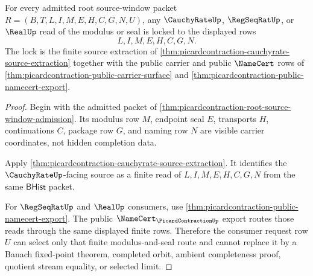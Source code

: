 \begin{theorem}
\label{thm:picardcontraction-root-modulus-consumer-lock}
For every admitted root source-window packet
$R=(B,T,L,I,M,E,H,C,G,N,U)$, any $\CauchyRateUp$, $\RegSeqRatUp$, or
$\RealUp$ read of the modulus or seal is locked to the displayed rows
$$
L,I,M,E,H,C,G,N.
$$
The lock is the finite source extraction of
\autoref{thm:picardcontraction-cauchyrate-source-extraction} together with the
public carrier and public $\NameCert$ rows of
\autoref{thm:picardcontraction-public-carrier-surface} and
\autoref{thm:picardcontraction-public-namecert-export}.
\end{theorem}
\begin{proof}
Begin with the admitted packet of
\autoref{thm:picardcontraction-root-source-window-admission}. Its modulus row
$M$, endpoint seal $E$, transports $H$, continuations $C$, package row $G$,
and naming row $N$ are visible carrier coordinates, not hidden completion
data.

Apply \autoref{thm:picardcontraction-cauchyrate-source-extraction}. It
identifies the $\CauchyRateUp$-facing source as a finite read of
$L,I,M,E,H,C,G,N$ from the same $\mathsf{BHist}$ packet.

For $\RegSeqRatUp$ and $\RealUp$ consumers, use
\autoref{thm:picardcontraction-public-namecert-export}. The public
$\NameCert_{\PicardContractionUp}$ export routes those reads through the same
displayed finite rows. Therefore the consumer request row $U$ can select only
that finite modulus-and-seal route and cannot replace it by a Banach
fixed-point theorem, completed orbit, ambient completeness proof, quotient
stream equality, or selected limit.
\end{proof}

